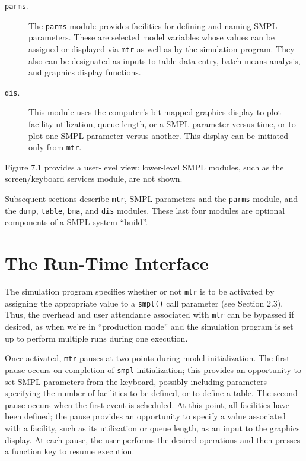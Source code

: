\begin{description}
\item[\texttt{parms}.] The \texttt{parms} module provides facilities for defining
and naming SMPL parameters. These are selected model
variables whose values can be assigned or displayed via \texttt{mtr}
as well as by the simulation program. They also can be designated
as inputs to table data entry, batch means analysis,
and graphics display functions.
\item[\texttt{dis}.] This module uses the computer's bit-mapped graphics
display to plot facility utilization, queue length, or a SMPL
parameter versus time, or to plot one SMPL parameter versus
another. This display can be initiated only from \texttt{mtr}.
\end{description}
Figure 7.1 provides a user-level view: lower-level SMPL modules, such as
the screen/keyboard services module, are not shown.

Subsequent sections describe \texttt{mtr}, SMPL parameters and the \texttt{parms} module,
and the \texttt{dump}, \texttt{table}, \texttt{bma}, and \texttt{dis} modules. These last four modules are
optional components of a SMPL system ``build''.


\section{The Run-Time Interface}
\label{sec:simenv-mtr}

The simulation program specifies whether or not \texttt{mtr} is to be activated
by assigning the appropriate value to a \texttt{smpl()} call parameter (see Section
2.3). Thus, the overhead and user attendance associated with \texttt{mtr} can be
bypassed if desired, as when we're in ``production mode'' and the simulation
program is set up to perform multiple runs during one execution.

Once activated, \texttt{mtr} pauses at two points during model initialization.
The first pause occurs on completion of \texttt{smpl} initialization; this provides an
opportunity to set SMPL parameters from the keyboard, possibly including
parameters specifying the number of facilities to be defined, or to define a
table. The second pause occurs when the first event is scheduled. At this
point, all facilities have been defined; the pause provides an opportunity to
specify a value associated with a facility, such as its utilization or queue
length, as an input to the graphics display. At each pause, the user performs
the desired operations and then presses a function key to resume execution.

